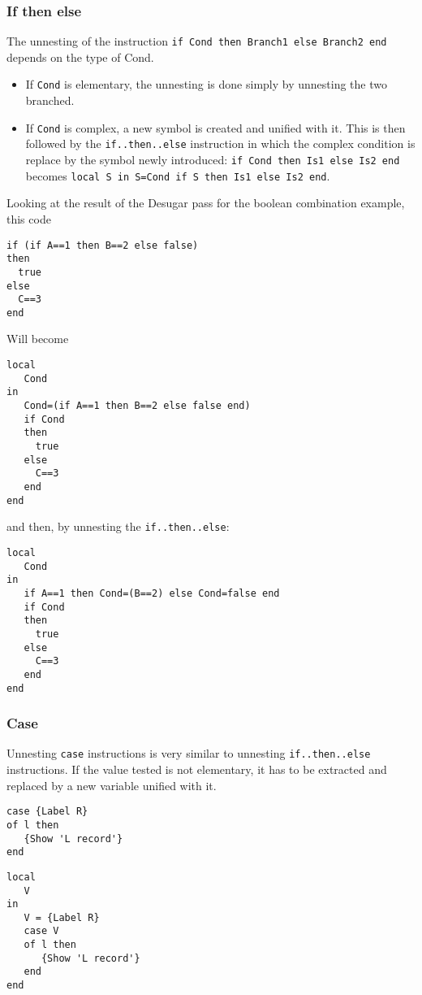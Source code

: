 \documentclass[a4paper]{memoir}
\begin{document}
\subsubsection{If then else}
The unnesting of the instruction \lstinline!if Cond then Branch1 else Branch2 end! depends on the type of Cond. 
\begin{itemize}
  \item If \lstinline!Cond! is elementary, the unnesting is done simply by unnesting the two branched.
  \item If \lstinline!Cond! is complex, a new symbol is created and unified with it. This is then followed by the \lstinline!if..then..else! instruction in which the complex condition is replace by the symbol newly introduced:
    \lstinline!if Cond then Is1 else Is2 end! becomes \lstinline!local S in S=Cond if S then Is1 else Is2 end!.
\end{itemize}
Looking at the result of the Desugar pass for the boolean combination example, this code
\begin{lstlisting}
if (if A==1 then B==2 else false)
then
  true
else
  C==3
end
\end{lstlisting}

Will become

\begin{lstlisting}
local
   Cond
in
   Cond=(if A==1 then B==2 else false end)
   if Cond
   then
     true
   else
     C==3
   end
end
\end{lstlisting}
and then, by unnesting the \lstinline!if..then..else!:
\begin{lstlisting}
local
   Cond
in
   if A==1 then Cond=(B==2) else Cond=false end
   if Cond
   then
     true
   else
     C==3
   end
end
\end{lstlisting}

\subsubsection{Case}
Unnesting \lstinline!case! instructions is very similar to unnesting
\lstinline!if..then..else! instructions. If the value tested is not elementary,
it has to be extracted and replaced by a new variable unified with it.
\begin{lstlisting}
case {Label R}
of l then
   {Show 'L record'}
end
\end{lstlisting}

\begin{lstlisting}
local
   V
in
   V = {Label R}
   case V 
   of l then
      {Show 'L record'}
   end
end
\end{lstlisting}
   
\end{document}
